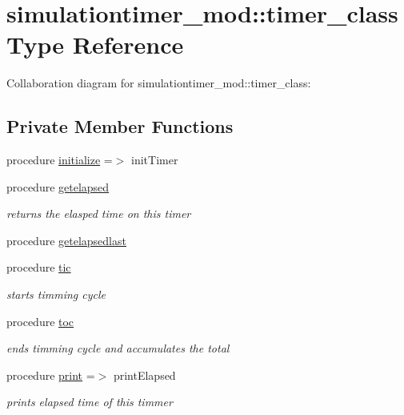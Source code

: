 \hypertarget{structsimulationtimer__mod_1_1timer__class}{}\section{simulationtimer\+\_\+mod\+:\+:timer\+\_\+class Type Reference}
\label{structsimulationtimer__mod_1_1timer__class}


Collaboration diagram for simulationtimer\+\_\+mod\+:\+:timer\+\_\+class\+:
\subsection*{Private Member Functions}
\begin{DoxyCompactItemize}
\item 
procedure \mbox{\hyperlink{structsimulationtimer__mod_1_1timer__class_a5ff00a291d05b6135e421e4b5718c810}{initialize}} =$>$ init\+Timer
\item 
procedure \mbox{\hyperlink{structsimulationtimer__mod_1_1timer__class_a8d93e7223e1bbd78bc38c72e88fd2e41}{getelapsed}}
\begin{DoxyCompactList}\small\item\em returns the elasped time on this timer \end{DoxyCompactList}\item 
procedure \mbox{\hyperlink{structsimulationtimer__mod_1_1timer__class_afdc04887277d28174b69cfa00ede5f38}{getelapsedlast}}
\item 
procedure \mbox{\hyperlink{structsimulationtimer__mod_1_1timer__class_ab51b61f25cc929cb440d0b9ffd039b34}{tic}}
\begin{DoxyCompactList}\small\item\em starts timming cycle \end{DoxyCompactList}\item 
procedure \mbox{\hyperlink{structsimulationtimer__mod_1_1timer__class_aa86e28516c4a22dac2aba3ccbf027233}{toc}}
\begin{DoxyCompactList}\small\item\em ends timming cycle and accumulates the total \end{DoxyCompactList}\item 
procedure \mbox{\hyperlink{structsimulationtimer__mod_1_1timer__class_a34a700b5bb4f2a401a582caf995e4cae}{print}} =$>$ print\+Elapsed
\begin{DoxyCompactList}\small\item\em prints elapsed time of this timmer \end{DoxyCompactList}\item 

\end{DoxyCompactItemize}
